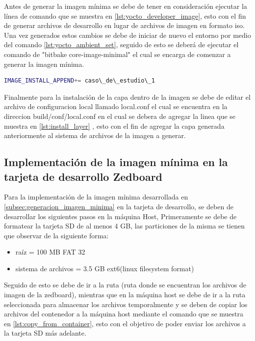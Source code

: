 Antes de generar la imagen mínima se debe de tener en consideración ejecutar la línea de comando que se muestra en \ref{lst:yocto_developer_image}, esto con el fin de generar archivos de desarrollo en lugar de archivos de imagen en formato iso. Una vez generados estos cambios se debe de iniciar de nuevo el entorno por medio del comando \ref{lst:yocto_ambient_set}, seguido de esto se deberá de ejecutar el comando de "bitbake core-image-minimal" el cual se encarga de comenzar a generar la imagen mínima.

\begin{lstlisting}[language=bash, caption={Instalar la capa generada, Yocto }, label=lst:install_layer]
    IMAGE_INSTALL_APPEND+= caso\_de\_estudio\_1
\end{lstlisting}

Finalmente para la instalación de la capa dentro de la imagen se debe de editar el archivo de configuracion local llamado local.conf el cual se encuentra en la direccion build/conf/local.conf en el cual se debera de agregar la linea que se muestra en \ref{lst:install_layer} , esto con el fin de agregar la capa generada anteriormente al sistema de archivos de la imagen a generar.


\subsection{Implementación de la imagen mínima en la tarjeta de desarrollo Zedboard}

Para la implementación de la imagen mínima desarrollada en \ref{subsec:generacion_imagen_minima} en la tarjeta de desarrollo, se deben de desarrollar los siguientes pasos en la máquina Host, Primeramente se debe de formatear la tarjeta SD de al menos 4 GB, las particiones de la misma se tienen que observar de la siguiente forma:

\begin{itemize}
    \item raíz = 100 MB FAT 32
    \item sistema de archivos = 3.5 GB ext6(linux filesystem format)
\end{itemize} 

Seguido de esto se debe de ir a la ruta (ruta donde se encuentran los archivos de imagen de la zedboard), mientras que en la máquina host se debe de ir a la ruta seleccionada para almacenar los archivos temporalmente y se deben de copiar los archivos del contenedor a la máquina host mediante el comando que se muestra en \ref{lst:copy_from_container}, esto con el objetivo de poder enviar los archivos a la tarjeta SD más adelante.

